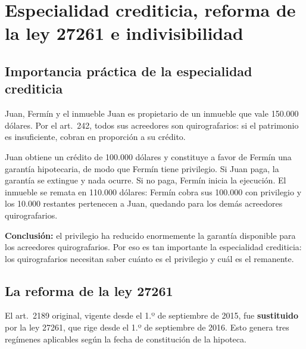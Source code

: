 \documentclass[12pt,oneside]{book}
\begin{document}
\chapter[Especialidad crediticia, reforma e indivisibilidad]{Especialidad crediticia, reforma de la ley 27261 e indivisibilidad}

\section{Importancia práctica de la especialidad crediticia}

\begin{example}{Juan, Fermín y el inmueble}
Juan es propietario de un inmueble que vale 150.000 dólares. Por el art.~242, todos sus acreedores son quirografarios: si el patrimonio es insuficiente, cobran en proporción a su crédito.

Juan obtiene un crédito de 100.000 dólares y constituye a favor de Fermín una garantía hipotecaria, de modo que Fermín tiene privilegio. Si Juan paga, la garantía se extingue y nada ocurre. Si no paga, Fermín inicia la ejecución. El inmueble se remata en 110.000 dólares: Fermín cobra sus 100.000 con privilegio y los 10.000 restantes pertenecen a Juan, quedando para los demás acreedores quirografarios.

\textbf{Conclusión:} el privilegio ha reducido enormemente la garantía disponible para los acreedores quirografarios. Por eso es tan importante la especialidad crediticia: los quirografarios necesitan saber cuánto es el privilegio y cuál es el remanente.
\end{example}

\section{La reforma de la ley 27261}

El art.~2189 original, vigente desde el 1.º de septiembre de 2015, fue \textbf{sustituido} por la ley 27261, que rige desde el 1.º de septiembre de 2016. Esto genera tres regímenes aplicables según la fecha de constitución de la hipoteca.
\end{document}
